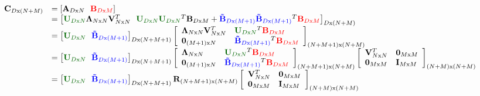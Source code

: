 \scriptsize
\begin{equation}
\begin{array}{llll}
\mathbf{C}_{D\mathrm{x}(N+M)} &= \left[{\mathbf{A}_{D\mathrm{x}N}} \ \ {\color{red}{\color{red}\mathbf{B}_{D\mathrm{x}M}}}\right]\\
&= \left[{\color{darkgreen}\mathbf{U}_{D\mathrm{x}N}}\mathbf{\Lambda}_{N\mathrm{x}N}\mathbf{V}_{N\mathrm{x}N}^T \ \ {\color{darkgreen}\mathbf{U}_{D\mathrm{x}N}}{\color{darkgreen}\mathbf{U}_{D\mathrm{x}N}}^T\mathbf{B}_{D\mathrm{x}M} + {\color{blue}\mathbf{\tilde{B}}_{D\mathrm{x}(M+1)}} {{\color{blue}\mathbf{\tilde{B}}_{D\mathrm{x}(M+1)}}^T}{\color{red}{\color{red}\mathbf{B}_{D\mathrm{x}M}}}\right]_{D\mathrm{x}(N+M)}\\
&= \left[{\color{darkgreen}\mathbf{U}_{D\mathrm{x}N}} \ \ {\color{blue}\mathbf{\tilde{B}}_{D\mathrm{x}(M+1)}}\right]_{D\mathrm{x}(N+M+1)}\left[\begin{array}{llll}\mathbf{\Lambda}_{N\mathrm{x}N}\mathbf{V}_{N\mathrm{x}N}^T &{\color{darkgreen}\mathbf{U}_{D\mathrm{x}N}}^T{\color{red}{\color{red}\mathbf{B}_{D\mathrm{x}M}}}\\ \mathbf{0}_{(M+1)\mathrm{x}N} & {\color{blue}\mathbf{\tilde{B}}_{D\mathrm{x}(M+1)}}^T{\color{red}{\color{red}\mathbf{B}_{D\mathrm{x}M}}}\end{array}\right]_{(N+M+1)\mathrm{x}(N+M)}\\
&= \left[{\color{darkgreen}\mathbf{U}_{D\mathrm{x}N}} \ \ {\color{blue}\mathbf{\tilde{B}}_{D\mathrm{x}(M+1)}}\right]_{D\mathrm{x}(N+M+1)}\left[\begin{array}{llll}\mathbf{\Lambda}_{N\mathrm{x}N} & {\color{darkgreen}\mathbf{U}_{D\mathrm{x}N}}^T{\color{red}{\color{red}\mathbf{B}_{D\mathrm{x}M}}}\\ \mathbf{0}_{(M+1)\mathrm{x}N} & {\color{blue}\mathbf{\tilde{B}}_{D\mathrm{x}(M+1)}}^T{\color{red}{\color{red}\mathbf{B}_{D\mathrm{x}M}}}\end{array}\right]_{(N+M+1)\mathrm{x}(N+M)} \left[\begin{array}{llll}\mathbf{V}_{N\mathrm{x}N}^T & \mathbf{0}_{M\mathrm{x}M}\\ \mathbf{0}_{M\mathrm{x}M} & \mathbf{I}_{M\mathrm{x}M}\end{array}\right]_{(N+M)\mathrm{x}(N+M)}\\
&= \left[{\color{darkgreen}\mathbf{U}_{D\mathrm{x}N}} \ \ {\color{blue}\mathbf{\tilde{B}}_{D\mathrm{x}(M+1)}}\right]_{D\mathrm{x}(N+M+1)}\mathbf{R}_{(N+M+1)\mathrm{x}(N+M)} \left[\begin{array}{llll}\mathbf{V}_{N\mathrm{x}N}^T & \mathbf{0}_{M\mathrm{x}M}\\ \mathbf{0}_{M\mathrm{x}M} & \mathbf{I}_{M\mathrm{x}M}\end{array}\right]_{(N+M)\mathrm{x}(N+M)}
\end{array}
\label{Eqn:long}
\end{equation}
\normalsize


